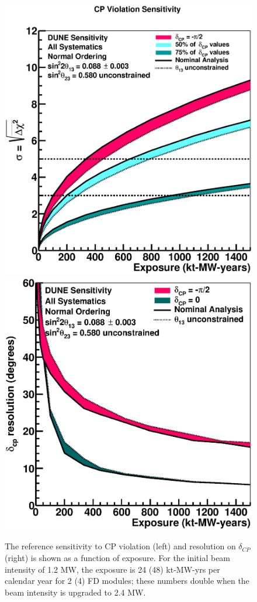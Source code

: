 \documentclass[11pt]{article}
\begin{document}
\begin{figure}[h]
\centering
\includegraphics[width=0.45\columnwidth]{graphics/cpv_exp_varyconstr_nh_2019_v4.eps}
\includegraphics[width=0.45\columnwidth]{graphics/dcpres_exp_varyconstr_nh_2019_v4.eps}
\caption{The reference sensitivity to CP violation (left) and resolution on $\delta_{CP}$ (right) is shown as a function of exposure. For the initial beam intensity of 1.2 MW, the exposure is 24 (48) kt-MW-yrs per calendar year for 2 (4) FD modules; these numbers double when the beam intensity is upgraded to 2.4 MW.}
\label{fig:longterm_sensitivity}
\end{figure}
\end{document}

